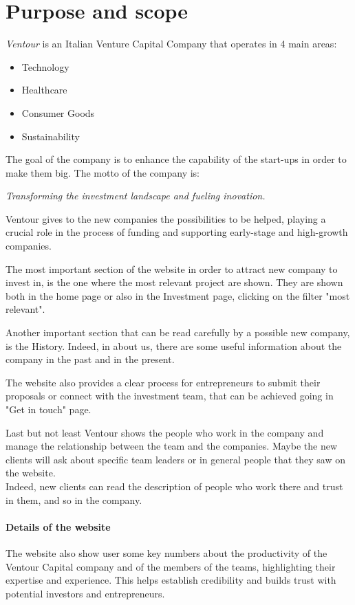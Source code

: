 \documentclass[../../DD.tex]{subfiles}
\begin{document}
\section{Purpose and scope}
\textit{Ventour} is an Italian Venture Capital Company that operates in 4 main areas:
\begin{itemize}
    \item Technology
    \item Healthcare
    \item Consumer Goods
    \item Sustainability
\end{itemize}
The goal of the company is to enhance the capability of the start-ups in order to make them big.
The motto of the company is:
\begin{center}
    \textit{Transforming the investment landscape and fueling inovation.}
\end{center}
    Ventour gives to the new companies the possibilities to be helped, playing a crucial role in the process of funding and supporting early-stage and high-growth companies.

    The most important section of the website in order to attract new company to invest in, is the one where the most relevant project are shown. They are shown both in the home page or also in the Investment page, clicking on the filter "most relevant".

    Another important section that can be read carefully by a possible new company, is the History. Indeed, in about us, there are some useful information about the company in the past and in the present.  

    The website also provides a clear process for entrepreneurs to submit their proposals or connect with the investment team, that can be achieved going in "Get in touch" page.

    Last but not least Ventour shows the people who work in the company and manage the relationship between the team and the companies. Maybe the new clients will ask about specific team leaders or in general people that they saw on the website.  \\
    Indeed, new clients can read the description of people who work there and trust in them, and so in the company.

    \paragraph{Details of the website} The website also show user some key numbers about the productivity of the Ventour Capital company and of the members of the teams, highlighting their expertise and experience. This helps establish credibility and builds trust with potential investors and entrepreneurs.
\end{document}

